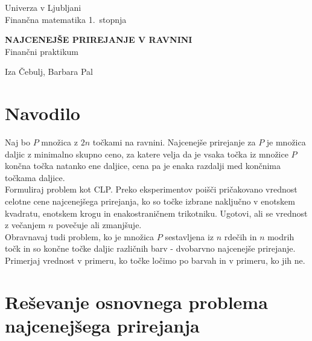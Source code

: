\documentclass[a4paper, 11pt]{article}
\newcommand{\program}{Finančna matematika 1.~stopnja} %
\newcommand{\imeavtorja}{Iza Čebulj, Barbara Pal} %
\newcommand{\naslovdela}{Najcenejše prirejanje v ravnini}
\newcommand{\letnica}{2022}
\newcommand{\predmet}{Finančni praktikum}
\begin{document}
\thispagestyle{empty}
\begin{center}
\begin{minipage}{0.75\linewidth}
    \centering
    {\Large Univerza v Ljubljani \\ \program}
    \\
    \vspace{3cm}

    {\uppercase{\Large \textbf{\naslovdela}}} \\ \predmet\\
    \vspace{3cm}

    {\Large \imeavtorja\par}
    \vspace{9cm}

\end{minipage}
\end{center}

\noindent{\large
Ljubljana, \letnica}
\pagebreak

\thispagestyle{empty}
\tableofcontents
\listoffigures
\pagebreak

\section{Navodilo}
Naj bo $P$ množica z $2n$ točkami na ravnini. Najcenejše prirejanje za $P$ je množica daljic z minimalno skupno ceno, za katere velja da je vsaka točka iz množice $P$ končna točka natanko ene daljice, cena pa je enaka razdalji med končnima točkama daljice. \\
Formuliraj problem kot CLP. Preko eksperimentov poišči pričakovano vrednost celotne cene najcenejšega prirejanja, ko so točke izbrane naključno v enotskem kvadratu, enotskem krogu in enakostraničnem trikotniku.
Ugotovi, ali se vrednost z večanjem $n$ povečuje ali zmanjšuje. \\
Obravnavaj tudi problem, ko je množica $P$ sestavljena iz $n$ rdečih in $n$ modrih točk in so končne točke daljic različnih barv - dvobarvno najcenejše prirejanje. 
Primerjaj vrednost v primeru, ko točke ločimo po barvah in v primeru, ko jih ne.  

\section{Reševanje osnovnega problema najcenejšega prirejanja}
\end{document}
